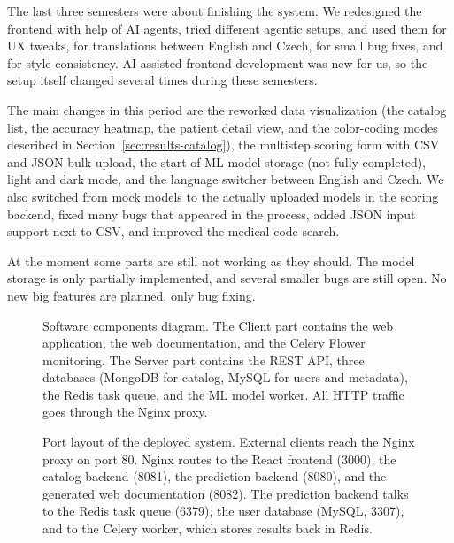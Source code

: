 The last three semesters were about finishing the system. We redesigned the frontend with help of AI agents, tried different agentic setups, and used them for UX tweaks, for translations between English and Czech, for small bug fixes, and for style consistency. AI-assisted frontend development was new for us, so the setup itself changed several times during these semesters.

The main changes in this period are the reworked data visualization (the catalog list, the accuracy heatmap, the patient detail view, and the color-coding modes described in Section~\ref{sec:results-catalog}), the multistep scoring form with CSV and JSON bulk upload, the start of ML model storage (not fully completed), light and dark mode, and the language switcher between English and Czech. We also switched from mock models to the actually uploaded models in the scoring backend, fixed many bugs that appeared in the process, added JSON input support next to CSV, and improved the medical code search.

At the moment some parts are still not working as they should. The model storage is only partially implemented, and several smaller bugs are still open. No new big features are planned, only bug fixing.

\begin{figure}[h]
    \centering
    \caption{Software components diagram. The Client part contains the web application, the web documentation, and the Celery Flower monitoring. The Server part contains the REST API, three databases (MongoDB for catalog, MySQL for users and metadata), the Redis task queue, and the ML model worker. All HTTP traffic goes through the Nginx proxy.}
    \label{fig:sw-components}
\end{figure}

\begin{figure}[h]
    \centering
    \caption{Port layout of the deployed system. External clients reach the Nginx proxy on port 80. Nginx routes to the React frontend (3000), the catalog backend (8081), the prediction backend (8080), and the generated web documentation (8082). The prediction backend talks to the Redis task queue (6379), the user database (MySQL, 3307), and to the Celery worker, which stores results back in Redis.}
    \label{fig:sw-ports}
\end{figure}

